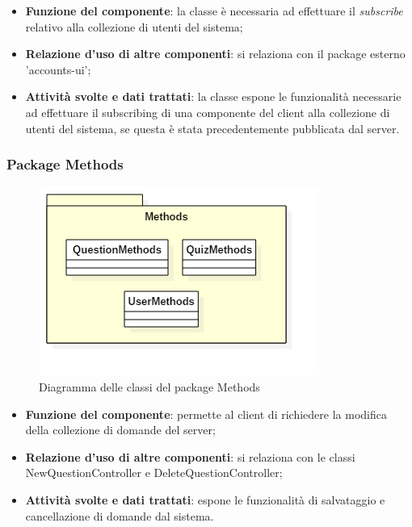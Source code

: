 
\begin{itemize}
	\item\textbf{Funzione del componente}: la classe è necessaria ad effettuare il \emph{subscribe} relativo alla collezione di utenti del sistema;
	\item\textbf{Relazione d'uso di altre componenti}: si relaziona con il package esterno 'accounts-ui';
	\item\textbf{Attività svolte e dati trattati}: la classe espone le funzionalità necessarie ad effettuare il subscribing di una componente del client alla collezione di utenti del sistema, se questa è stata precedentemente pubblicata dal server.
\end{itemize}

\subsubsection{Package Methods}
\begin{figure}[h!]
\begin{center}
	\includegraphics[scale=0.65]{../images/MethodsClass.png}
	\caption{Diagramma delle classi del package Methods}
\end{center}
\end{figure}

\begin{itemize}
	\item\textbf{Funzione del componente}: permette al client di richiedere la modifica della collezione di domande del server;
	\item\textbf{Relazione d'uso di altre componenti}: si relaziona con le classi NewQuestionController e DeleteQuestionController;
	\item\textbf{Attività svolte e dati trattati}: espone le funzionalità di salvataggio e cancellazione di domande dal sistema.
\end{itemize}

